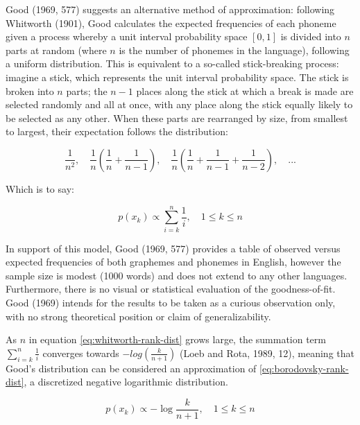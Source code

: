 Good (1969, 577) suggests an alternative method of approximation: following Whitworth (1901), Good calculates the expected frequencies of each phoneme given a process whereby a unit interval probability space \([0,1]\) is divided into \(n\) parts at random (where \(n\) is the number of phonemes in the language), following a uniform distribution. This is equivalent to a so-called stick-breaking process: imagine a stick, which represents the unit interval probability space. The stick is broken into \(n\) parts; the \(n-1\) places along the stick at which a break is made are selected randomly and all at once, with any place along the stick equally likely to be selected as any other. When these parts are rearranged by size, from smallest to largest, their expectation follows the distribution:

\begin{equation}
\frac{1}{n^2},\quad \frac{1}{n} \left( \frac{1}{n} + \frac{1}{n-1} \right),\quad \frac{1}{n} \left( \frac{1}{n} + \frac{1}{n-1} + \frac{1}{n-2} \right),\quad ...
\label{eq:whitworth-dist}
\end{equation}

Which is to say:

\begin{equation}
p(x_k) \propto \sum_{i=k}^{n} \frac{1}{i}, \quad 1 \leq k \leq n
\label{eq:whitworth-rank-dist}
\end{equation}

In support of this model, Good (1969, 577) provides a table of observed versus expected frequencies of both graphemes and phonemes in English, however the sample size is modest (1000 words) and does not extend to any other languages. Furthermore, there is no visual or statistical evaluation of the goodness-of-fit. Good (1969) intends for the results to be taken as a curious observation only, with no strong theoretical position or claim of generalizability.

As \(n\) in equation \eqref{eq:whitworth-rank-dist} grows large, the summation term \(\sum_{i=k}^{n} \frac{1}{i}\) converges towards \(-log(\frac{k}{n+1})\) (Loeb and Rota, 1989, 12), meaning that Good's distribution can be considered an approximation of \eqref{eq:borodovsky-rank-dist}, a discretized negative logarithmic distribution.

\begin{equation}
p(x_k) \propto -\log \frac{k}{n+1}, \quad 1 \leq k \leq n
\label{eq:borodovsky-rank-dist}
\end{equation}

